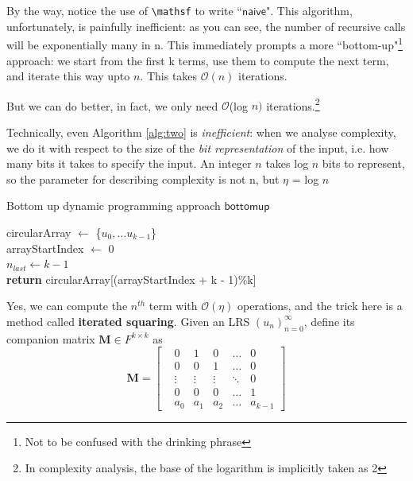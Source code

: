 \documentclass[answers]{exam}
\theoremstyle{definition}
\newcommand{\term}[0]{(u_n)_{n=0}^\infty}
\newcommand{\M}[0]{\textbf{M}}
\begin{document}
By the way, notice the use of \verb|\mathsf| to write ``$\mathsf{naive}$". This algorithm, unfortunately, is painfully
inefficient: as you can see, the number of recursive calls will be exponentially many in n. This
immediately prompts a more ``bottom-up"\footnote{Not to be confused with the drinking phrase} approach: we start from the first k terms, use them to compute the next term, and iterate this way upto $n$. This takes $\mathcal{O}(n)$ iterations.

But we can do better, in fact, we only need $\mathcal{O}$(log $n)$ iterations.\footnote{In complexity analysis, the base of the logarithm is implicitly taken as 2} 

Technically, even Algorithm \ref{alg:two} is \textit{inefficient}: when we analyse complexity, we do it with respect to the size of the \textit{bit representation} of the input, i.e. how many bits it takes to specify the input. An integer $n$ takes log $n$ bits to represent, so the parameter for describing complexity is not n, but $\eta$ = log $n$
\newpage
\begin{algorithm}
\caption{Bottom up dynamic programming approach $\mathsf{bottomup}$}\label{alg:two}
\KwData{LRS $\term, n$}
circularArray $\leftarrow$ \{$u_0,\ldots u_{k-1}$\} \\
arrayStartIndex $\leftarrow$ 0 \\
$n_{last} \leftarrow  k-1 $ \\
\textbf{return} circularArray[(arrayStartIndex + k - 1)\%k]
\end{algorithm}
Yes, we can compute the $n^{th}$ term with  $\mathcal{O}(\eta)$ operations, and the trick here is a method called
\textbf{iterated squaring}. Given an LRS $\term$, define its companion matrix $\M \in F^{k\times k}$ as
\begin{equation}\label{eqn:two}
    \M = 
    \begin{bmatrix}
    & 0 & 1 & 0 & \ldots & 0 \\
    & 0 & 0 & 1 & \ldots & 0 \\
    & \vdots & \vdots & \vdots & \ddots & 0 \\
    & 0 & 0 & 0 & \ldots & 1 \\
    & a_0 & a_1 & a_2 & \ldots & a_{k-1}
    \end{bmatrix}
\end{equation} 
\end{document}
